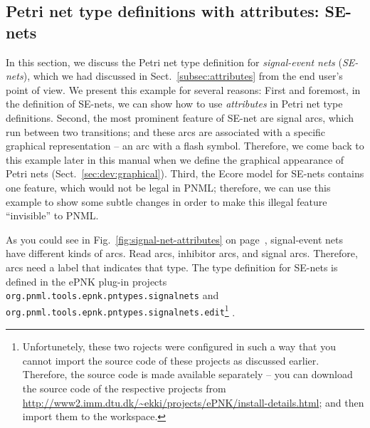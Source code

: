\subsection{Petri net type definitions with attributes: SE-nets}
\label{subsec:PNTD:SE-Nets}

In this section, we discuss the Petri net type definition for \emph{signal-event
nets} (\emph{SE-nets}), which we had discussed in Sect.~\ref{subsec:attributes}
from the end user's point of view.
We present this example for several reasons: First and foremost, in the
definition of SE-nets, we can show how to use \emph{attributes} in Petri
net type definitions.
Second, the most prominent feature of SE-net are signal arcs, which run
between two transitions; and these arcs are associated with a specific graphical
representation -- an arc with a flash symbol. Therefore, we come back to this
example later in this manual when we define the graphical appearance of Petri
nets (Sect.~\ref{sec:dev:graphical}).
Third, the Ecore model for SE-nets contains one feature, which would not be legal
in PNML; therefore, we can use this example to show some subtle changes
in order to make this illegal feature ``invisible'' to PNML.

As you could see in Fig.~\ref{fig:signal-net-attributes} on
page~\pageref{fig:signal-net-attributes}, signal-event nets have different kinds
of arcs. Read arcs, inhibitor arcs, and signal arcs. Therefore, arcs
need a label that indicates that type. The type definition
for SE-nets is defined in the ePNK plug-in projects {\tt
org.pnml.tools.epnk.pntypes.signalnets} and {\tt
org.pnml.tools.epnk.pntypes.signalnets.edit}\footnote
 {Unfortunetely, these two rojects were configured in such a way that you cannot
  import the source code of these projects as discussed earlier. Therefore, 
  the source code is made available separately -- you can download the
  source code of the respective projects from
  \url{http://www2.imm.dtu.dk/~ekki/projects/ePNK/install-details.html};
  and then import them to the workspace.}%
.

